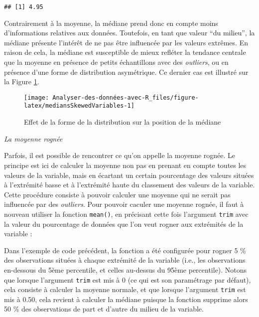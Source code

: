 \documentclass[
]{book}
\newenvironment{Shaded}{\begin{snugshade}}{\end{snugshade}}
\newcommand{\AttributeTok}[1]{\textcolor[rgb]{0.77,0.63,0.00}{#1}}
\newcommand{\FloatTok}[1]{\textcolor[rgb]{0.00,0.00,0.81}{#1}}
\newcommand{\FunctionTok}[1]{\textcolor[rgb]{0.00,0.00,0.00}{#1}}
\newcommand{\NormalTok}[1]{#1}
\newcommand{\SpecialCharTok}[1]{\textcolor[rgb]{0.00,0.00,0.00}{#1}}
\begin{document}
\begin{verbatim}
## [1] 4.95
\end{verbatim}

Contrairement à la moyenne, la médiane prend donc en compte moins d'informations relatives aux données. Toutefois, en tant que valeur ``du milieu'', la médiane présente l'intérêt de ne pas être influencée par les valeurs extrêmes. En raison de cela, la médiane est susceptible de mieux refléter la tendance centrale que la moyenne en présence de petits échantillons avec des \emph{outliers}, ou en présence d'une forme de distribution asymétrique. Ce dernier cas est illustré sur la Figure \ref{fig:mediansSkewedVariables}.

\begin{figure}

{\centering \texttt{[image: Analyser-des-données-avec-R\_files/figure-latex/mediansSkewedVariables-1]} 

}

\caption{Effet de la forme de la distribution sur la position de la médiane}\label{fig:mediansSkewedVariables}
\end{figure}

\emph{La moyenne rognée}

Parfois, il est possible de rencontrer ce qu'on appelle la moyenne rognée. Le principe est ici de calculer la moyenne non pas en prenant en compte toutes les valeurs de la variable, mais en écartant un certain pourcentage des valeurs situées à l'extrémité basse et à l'extrémité haute du classement des valeurs de la variable. Cette procédure consiste à pouvoir calculer une moyenne qui ne serait pas influencée par des \emph{outliers}. Pour pouvoir caculer une moyenne rognée, il faut à nouveau utiliser la fonction \texttt{mean()}, en précisant cette fois l'argument \texttt{trim} avec la valeur du pourcentage de données que l'on veut rogner aux extrémités de la variable :

\begin{Shaded}
\end{Shaded}

Dans l'exemple de code précédent, la fonction a été configurée pour rogner 5 \% des observations situées à chaque extrémité de la variable (i.e., les observations en-dessous du 5ème percentile, et celles au-dessus du 95ème percentile). Notons que lorsque l'argument \texttt{trim} est mis à 0 (ce qui est son paramétrage par défaut), cela consiste à calculer la moyenne normale, et que lorsque l'argument \texttt{trim} est mis à 0.50, cela revient à calculer la médiane puisque la fonction supprime alors 50 \% des observations de part et d'autre du milieu de la variable.
\end{document}
